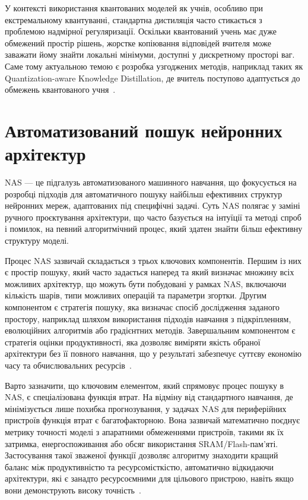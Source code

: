\documentclass{pma-mthesis}
\begin{document}
У контексті використання квантованих моделей як учнів, особливо при екстремальному квантуванні, стандартна дистиляція часто стикається з проблемою надмірної регуляризації. Оскільки квантований учень має дуже обмежений простір рішень, жорстке копіювання відповідей вчителя може заважати йому знайти локальні мінімуми, доступні у дискретному просторі ваг. Саме тому актуальною темою є розробка узгоджених методів, наприклад таких як Quantization-aware Knowledge Distillation, де вчитель поступово адаптується до обмежень квантованого учня~\cite{kim2020qkd}.

\section{Автоматизований пошук нейронних архітектур}

NAS --- це підгалузь автоматизованого машинного навчання, що фокусується на розробці підходів для автоматичного пошуку найбільш ефективних структур нейронних мереж, адаптованих під специфічні задачі. Суть NAS полягає у заміні ручного проєктування архітектури, що часто базується на інтуїції та методі спроб і помилок, на певний алгоритмічний процес, який здатен знайти більш ефективну структуру моделі.

Процес NAS зазвичай складається з трьох ключових компонентів. Першим із них є простір пошуку, який часто задається наперед та який визначає множину всіх можливих архітектур, що можуть бути побудовані у рамках NAS, включаючи кількість шарів, типи можливих операцій та параметри згортки. Другим компонентом є стратегія пошуку, яка визначає спосіб дослідження заданого простору, наприклад шляхом використання підходів навчання з підкріпленням, еволюційних алгоритмів або градієнтних методів. Завершальним компонентом є стратегія оцінки продуктивності, яка дозволяє виміряти якість обраної архітектури без її повного навчання, що у результаті забезпечує суттєву економію часу та обчислювальних ресурсів~\cite{elsken2019neural}.

Варто зазначити, що ключовим елементом, який спрямовує процес пошуку в NAS, є спеціалізована функція втрат. На відміну від стандартного навчання, де мінімізується лише похибка прогнозування, у задачах NAS для периферійних пристроїв функція втрат є багатофакторною. Вона зазвичай математично поєднує метрику точності моделі з апаратними обмеженнями пристроїв, такими як їх затримка, енергоспоживання або обсяг використання SRAM/Flash-пам'яті. Застосування такої зваженої функції дозволяє алгоритму знаходити кращий баланс між продуктивністю та ресурсомісткістю, автоматично відкидаючи архітектури, які є занадто ресурсоємними для цільового пристрою, навіть якщо вони демонструють високу точність~\cite{saha2022machine}.
\end{document}
